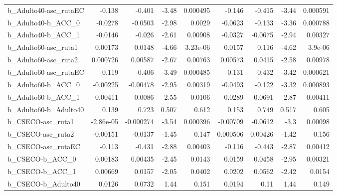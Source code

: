 \begin{tabular}{lrrrrrrrr}
b\_Adulto40-asc\_rutaEC      &      -0.138 &       -0.401 &    -3.48 & 0.000495 &     -0.146 &      -0.415 &        -3.44 &      0.000591 \\
b\_Adulto40-b\_ACC\_0         &     -0.0278 &      -0.0503 &    -2.98 &   0.0029 &    -0.0623 &      -0.133 &        -3.36 &      0.000788 \\
b\_Adulto40-b\_ACC\_1         &     -0.0146 &       -0.026 &    -2.61 &  0.00908 &    -0.0327 &     -0.0675 &        -2.94 &       0.00327 \\
b\_Adulto60-asc\_ruta1       &     0.00173 &       0.0148 &    -4.66 & 3.23e-06 &     0.0157 &       0.116 &        -4.62 &       3.9e-06 \\
b\_Adulto60-asc\_ruta2       &    0.000726 &      0.00587 &    -2.67 &  0.00763 &    0.00573 &      0.0415 &        -2.58 &       0.00978 \\
b\_Adulto60-asc\_rutaEC      &      -0.119 &       -0.406 &    -3.49 & 0.000485 &     -0.131 &      -0.432 &        -3.42 &      0.000621 \\
b\_Adulto60-b\_ACC\_0         &    -0.00225 &     -0.00478 &    -2.95 &  0.00319 &    -0.0493 &      -0.122 &        -3.32 &      0.000893 \\
b\_Adulto60-b\_ACC\_1         &     0.00411 &       0.0086 &    -2.55 &   0.0106 &    -0.0289 &     -0.0691 &        -2.87 &       0.00411 \\
b\_Adulto60-b\_Adulto40      &       0.139 &        0.723 &    0.507 &    0.612 &      0.153 &       0.749 &        0.517 &         0.605 \\
b\_CSECO-asc\_ruta1          &   -2.86e-05 &    -0.000274 &    -3.54 & 0.000396 &   -0.00709 &     -0.0612 &         -3.3 &       0.00098 \\
b\_CSECO-asc\_ruta2          &    -0.00151 &      -0.0137 &    -1.45 &    0.147 &   0.000506 &     0.00426 &        -1.42 &         0.156 \\
b\_CSECO-asc\_rutaEC         &      -0.113 &       -0.431 &    -2.88 &  0.00403 &     -0.116 &      -0.443 &        -2.87 &       0.00412 \\
b\_CSECO-b\_ACC\_0            &     0.00183 &      0.00435 &    -2.45 &   0.0143 &     0.0159 &      0.0458 &        -2.95 &       0.00321 \\
b\_CSECO-b\_ACC\_1            &     0.00669 &       0.0157 &    -2.05 &   0.0402 &     0.0202 &      0.0562 &        -2.42 &        0.0154 \\
b\_CSECO-b\_Adulto40         &      0.0126 &       0.0732 &     1.44 &    0.151 &     0.0194 &        0.11 &         1.44 &         0.149 \\

\end{tabular}
